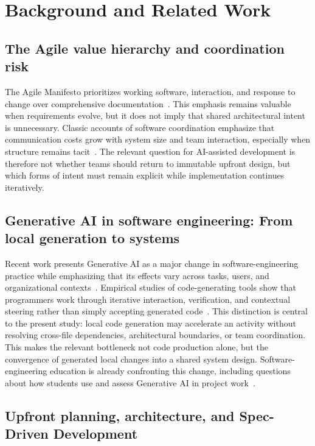 \section{Background and Related Work}

\subsection{The Agile value hierarchy and coordination risk}

The Agile Manifesto prioritizes working software, interaction, and response to
change over comprehensive documentation~\cite{agile_manifesto_2001}. This
emphasis remains valuable when requirements evolve, but it does not imply that
shared architectural intent is unnecessary. Classic accounts of software
coordination emphasize that communication costs grow with system size and team
interaction, especially when structure remains tacit~\cite{brooks_1975_mythical_man_month,demarco_lister_1987_peopleware}.
The relevant question for AI-assisted development is therefore not whether
teams should return to immutable upfront design, but which forms of intent must
remain explicit while implementation continues iteratively.

\subsection{Generative AI in software engineering: From local generation to systems}

Recent work presents Generative AI as a major change in software-engineering
practice while emphasizing that its effects vary across tasks, users, and
organizational contexts~\cite{carleton2024generative,banh2025copiloting,russo2024navigating}.
Empirical studies of code-generating tools show that programmers work through
iterative interaction, verification, and contextual steering rather than
simply accepting generated code~\cite{barke2023grounded}. This distinction is
central to the present study: local code generation may accelerate an activity
without resolving cross-file dependencies, architectural boundaries, or team
coordination. This makes the relevant bottleneck not code production alone,
but the convergence of generated local changes into a shared system design.
Software-engineering education is already confronting this change, including
questions about how students use and assess Generative AI in project
work~\cite{yabaku2024usage}.

\subsection{Upfront planning, architecture, and Spec-Driven Development}

